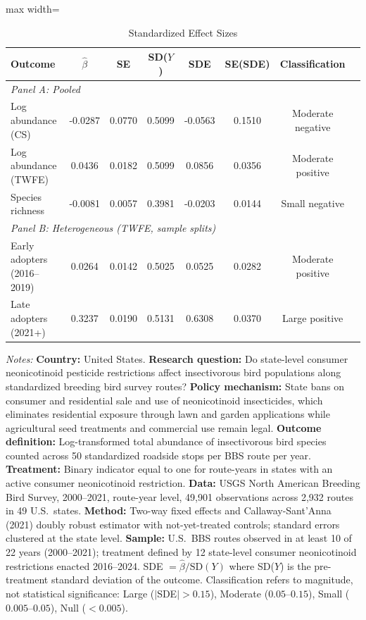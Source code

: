 \begin{table}[t]
\centering
\caption{Standardized Effect Sizes}
\label{tab:sde}
\begin{adjustbox}{max width=\textwidth}
\begin{tabular}{lccccccl}
\toprule
Outcome & $\hat{\beta}$ & SE & SD($Y$) & SDE & SE(SDE) & Classification \\
\midrule
\multicolumn{8}{l}{\textit{Panel A: Pooled}} \\[3pt]
Log abundance (CS) & -0.0287 & 0.0770 & 0.5099 & -0.0563 & 0.1510 & Moderate negative \\
Log abundance (TWFE) & 0.0436 & 0.0182 & 0.5099 & 0.0856 & 0.0356 & Moderate positive \\
Species richness & -0.0081 & 0.0057 & 0.3981 & -0.0203 & 0.0144 & Small negative \\
[6pt]
\multicolumn{8}{l}{\textit{Panel B: Heterogeneous (TWFE, sample splits)}} \\[3pt]
Early adopters (2016--2019) & 0.0264 & 0.0142 & 0.5025 & 0.0525 & 0.0282 & Moderate positive \\
Late adopters (2021+) & 0.3237 & 0.0190 & 0.5131 & 0.6308 & 0.0370 & Large positive \\
\bottomrule
\end{tabular}
\end{adjustbox}
\begin{tablenotes}[flushleft]
\item \textit{Notes:} \textbf{Country:} United States. \textbf{Research question:} Do state-level consumer neonicotinoid pesticide restrictions affect insectivorous bird populations along standardized breeding bird survey routes? \textbf{Policy mechanism:} State bans on consumer and residential sale and use of neonicotinoid insecticides, which eliminates residential exposure through lawn and garden applications while agricultural seed treatments and commercial use remain legal. \textbf{Outcome definition:} Log-transformed total abundance of insectivorous bird species counted across 50 standardized roadside stops per BBS route per year. \textbf{Treatment:} Binary indicator equal to one for route-years in states with an active consumer neonicotinoid restriction. \textbf{Data:} USGS North American Breeding Bird Survey, 2000--2021, route-year level, 49,901 observations across 2,932 routes in 49 U.S.\ states. \textbf{Method:} Two-way fixed effects and Callaway-Sant'Anna (2021) doubly robust estimator with not-yet-treated controls; standard errors clustered at the state level. \textbf{Sample:} U.S.\ BBS routes observed in at least 10 of 22 years (2000--2021); treatment defined by 12 state-level consumer neonicotinoid restrictions enacted 2016--2024. SDE $= \hat{\beta} / \text{SD}(Y)$ where SD($Y$) is the pre-treatment standard deviation of the outcome. Classification refers to magnitude, not statistical significance: Large ($|$SDE$| > 0.15$), Moderate ($0.05$--$0.15$), Small ($0.005$--$0.05$), Null ($< 0.005$).
\end{tablenotes}
\end{table}
